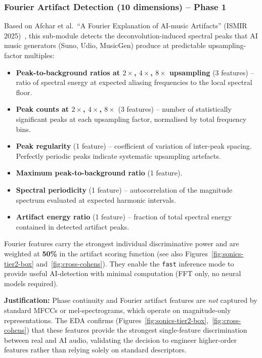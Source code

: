 \documentclass[11pt,a4paper]{article}
\begin{document}
\subsubsection{Fourier Artifact Detection (10 dimensions) -- Phase 1}

Based on Afchar et al.\ ``A Fourier Explanation of AI-music Artifacts'' (ISMIR 2025)~\cite{A1}, this sub-module detects the deconvolution-induced spectral peaks that AI music generators (Suno, Udio, MusicGen) produce at predictable upsampling-factor multiples:

\begin{itemize}[nosep]
  \item \textbf{Peak-to-background ratios at $2\times$, $4\times$, $8\times$ upsampling} (3 features) -- ratio of spectral energy at expected aliasing frequencies to the local spectral floor.
  \item \textbf{Peak counts at $2\times$, $4\times$, $8\times$} (3 features) -- number of statistically significant peaks at each upsampling factor, normalised by total frequency bins.
  \item \textbf{Peak regularity} (1 feature) -- coefficient of variation of inter-peak spacing. Perfectly periodic peaks indicate systematic upsampling artefacts.
  \item \textbf{Maximum peak-to-background ratio} (1 feature).
  \item \textbf{Spectral periodicity} (1 feature) -- autocorrelation of the magnitude spectrum evaluated at expected harmonic intervals.
  \item \textbf{Artifact energy ratio} (1 feature) -- fraction of total spectral energy contained in detected artifact peaks.
\end{itemize}

Fourier features carry the strongest individual discriminative power and are weighted at \textbf{50\%} in the artifact scoring function (see also Figures~\ref{fig:sonics-tier2-box} and~\ref{fig:cross-cohens}). They enable the \texttt{fast} inference mode to provide useful AI-detection with minimal computation (FFT only, no neural models required).

\textbf{Justification:} Phase continuity and Fourier artifact features are \emph{not} captured by standard MFCCs or mel-spectrograms, which operate on magnitude-only representations. The EDA confirms (Figures~\ref{fig:sonics-tier2-box},~\ref{fig:cross-cohens}) that these features provide the strongest single-feature discrimination between real and AI audio, validating the decision to engineer higher-order features rather than relying solely on standard descriptors.
\end{document}

